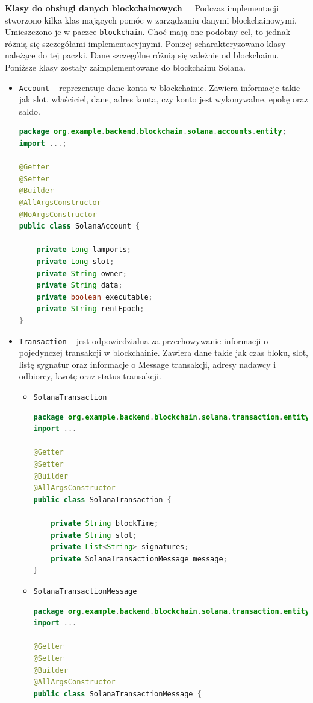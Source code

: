 \noindent \textbf{Klasy do obsługi danych blockchainowych~~}
Podczas implementacji stworzono kilka klas mających pomóc w zarządzaniu danymi blockchainowymi. Umieszczono je w paczce \texttt{blockchain}.
Choć mają one podobny cel, to jednak różnią się szczegółami implementacyjnymi. Poniżej scharakteryzowano klasy należące do tej paczki. Dane szczególne różnią się zależnie od blockchainu. Poniższe klasy zostały zaimplementowane do blockchainu Solana.
\begin{itemize}
\item \texttt{Account} -- reprezentuje dane konta w blockchainie. Zawiera informacje takie jak slot, właściciel, dane, adres konta, czy konto jest wykonywalne, epokę oraz saldo.  
	\begin{lstlisting}[language=Java, style=JavaStyle]
package org.example.backend.blockchain.solana.accounts.entity;
import ...;

@Getter
@Setter
@Builder
@AllArgsConstructor
@NoArgsConstructor
public class SolanaAccount {

	private Long lamports;
	private Long slot;
	private String owner;
	private String data;
	private boolean executable;
	private String rentEpoch;
}
	\end{lstlisting}
\item \texttt{Transaction} -- jest odpowiedzialna za przechowywanie informacji o pojedynczej transakcji w blockchainie. Zawiera dane takie jak czas bloku, slot, listę sygnatur oraz informacje o Message transakcji, adresy nadawcy i odbiorcy, kwotę oraz status transakcji.
\begin{itemize}
\item \texttt{SolanaTransaction}
\begin{lstlisting}[language=Java, style=JavaStyle]
package org.example.backend.blockchain.solana.transaction.entity.transaction;
import ...

@Getter
@Setter
@Builder
@AllArgsConstructor
public class SolanaTransaction {

	private String blockTime;
	private String slot;
	private List<String> signatures;
	private SolanaTransactionMessage message;
}
\end{lstlisting}
\item \texttt{SolanaTransactionMessage}
\begin{lstlisting}[language=Java, style=JavaStyle]
package org.example.backend.blockchain.solana.transaction.entity.transaction.message;
import ...

@Getter
@Setter
@Builder
@AllArgsConstructor
public class SolanaTransactionMessage {


\end{lstlisting}
\end{itemize}
\end{itemize}

